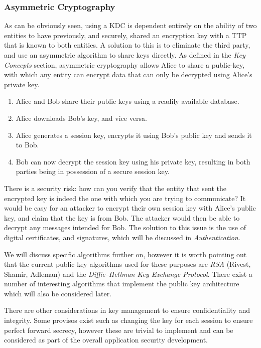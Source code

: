 \subsubsection{Asymmetric Cryptography}

As can be obviously seen, using a KDC is dependent entirely on the ability of two entities to have previously, and securely, shared an encryption key with a TTP that is known to both entities. A solution to this is to eliminate the third party, and use an asymmetric algorithm to share keys directly. As defined in the \emph{Key Concepts} section, asymmetric cryptography allows Alice to share a public-key, with which any entity can encrypt data that can only be decrypted using Alice's private key.

\begin{enumerate}
	\item Alice and Bob share their public keys using a readily available database.
	\item Alice downloads Bob's key, and vice versa.
	\item Alice generates a session key, encrypts it using Bob's public key and sends it to Bob.
	\item Bob can now decrypt the session key using his private key, resulting in both parties being in possession of a secure session key.
\end{enumerate}

There is a security risk: how can you verify that the entity that sent the encrypted key is indeed the one with which you are trying to communicate? It would be easy for an attacker to encrypt their own session key with Alice's public key, and claim that the key is from Bob. The attacker would then be able to decrypt any messages intended for Bob. The solution to this issue is the use of digital certificates, and signatures, which will be discussed in \emph{Authentication}.

We will discuss specific algorithms further on, however it is worth pointing out that the current public-key algorithms used for these purposes are \emph{RSA} (Rivest, Shamir, Adleman) and the \emph{Diffie--Hellman Key Exchange Protocol}. There exist a number of interesting algorithms that implement the public key architecture which will also be considered later.

There are other considerations in key management to ensure confidentiality and integrity. Some provisos exist such as changing the key for each session to ensure perfect forward secrecy, however these are trivial to implement and can be considered as part of the overall application security development.

